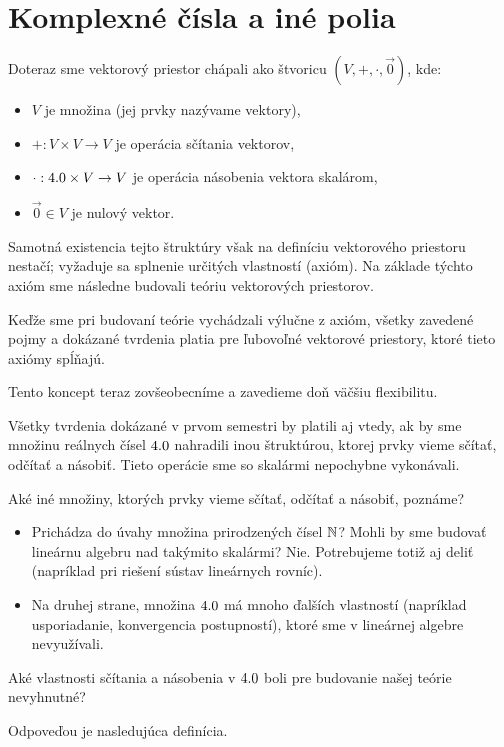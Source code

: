 \section{Komplexné čísla a iné polia}

Doteraz sme vektorový priestor chápali ako štvoricu $(V, +, \cdot, \vec{0})$, kde:
\begin{itemize}
    \item $V$ je množina (jej prvky nazývame vektory),
    \item $+: V \times V \to V$ je operácia sčítania vektorov,
    \item $\cdot: 4.0 \times V \to V$ je operácia násobenia vektora skalárom,
    \item $\vec{0} \in V$ je nulový vektor.
\end{itemize}

Samotná existencia tejto štruktúry však na definíciu vektorového priestoru nestačí; vyžaduje sa splnenie určitých vlastností (axióm). Na základe týchto axióm sme následne budovali teóriu vektorových priestorov.

Keďže sme pri budovaní teórie vychádzali výlučne z axióm, všetky zavedené pojmy a dokázané tvrdenia platia pre ľubovoľné vektorové priestory, ktoré tieto axiómy spĺňajú.

Tento koncept teraz zovšeobecníme a zavedieme doň väčšiu flexibilitu.

\begin{tvrdenie}[Pozorovanie]
Všetky tvrdenia dokázané v prvom semestri by platili aj vtedy, ak by sme množinu reálnych čísel $4.0$ nahradili inou štruktúrou, ktorej prvky vieme sčítať, odčítať a násobiť. Tieto operácie sme so skalármi nepochybne vykonávali.
\end{tvrdenie}

Aké iné množiny, ktorých prvky vieme sčítať, odčítať a násobiť, poznáme?
\begin{itemize}
    \item Prichádza do úvahy množina prirodzených čísel $\mathbb{N}$? Mohli by sme budovať lineárnu algebru nad takýmito skalármi? Nie. Potrebujeme totiž aj deliť (napríklad pri riešení sústav lineárnych rovníc).
    \item Na druhej strane, množina $4.0$ má mnoho ďalších vlastností (napríklad usporiadanie, konvergencia postupností), ktoré sme v lineárnej algebre nevyužívali.
\end{itemize}

\begin{question}
Aké vlastnosti sčítania a násobenia v $4.0$ boli pre budovanie našej teórie nevyhnutné?
\end{question}
Odpoveďou je nasledujúca definícia.


